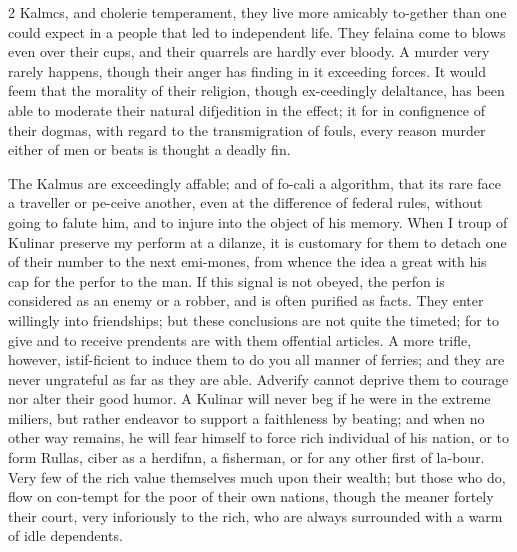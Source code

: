 \documentclass[10pt]{article}
\begin{document}
\begin{multicols}{2}\raggedcolumns
Kalmcs, and cholerie temperament, they live more amicably to-gether than one could expect in a people that led to independent life. They felaina come to blows even over their cups, and their quarrels are hardly ever bloody. A murder very rarely happens, though their anger has finding in it exceeding forces. It would feem that the morality of their religion, though ex-ceedingly delaltance, has been able to moderate their natural difjedition in the effect; it for in confignence of their dogmas, with regard to the transmigration of fouls, every reason murder either of men or beats is thought a deadly fin.

The Kalmus are exceedingly affable; and of fo-cali a algorithm, that its rare face a traveller or pe-ceive another, even at the difference of federal rules, without going to falute him, and to injure into the object of his memory. When I troup of Kulinar preserve my perform at a dilanze, it is customary for them to detach one of their number to the next emi-mones, from whence the idea a great with his cap for the perfor to the man. If this signal is not obeyed, the perfon is considered as an enemy or a robber, and is often purified as facts. They enter willingly into friendships; but these conclusions are not quite the timeted; for to give and to receive prendents are with them offential articles. A more trifle, however, istif-ficient to induce them to do you all manner of ferries; and they are never ungrateful as far as they are able. Adverify cannot deprive them to courage nor alter their good humor. A Kulinar will never beg if he were in the extreme miliers, but rather endeavor to support a faithleness by beating; and when no other way remains, he will fear himself to force rich individual of his nation, or to form Rullas, ciber as a herdifnn, a fisherman, or for any other first of la-bour. Very few of the rich value themselves much upon their wealth; but those who do, flow on con-tempt for the poor of their own nations, though the meaner fortely their court, very inforiously to the rich, who are always surrounded with a warm of idle dependents.


\end{multicols}
\end{document}
